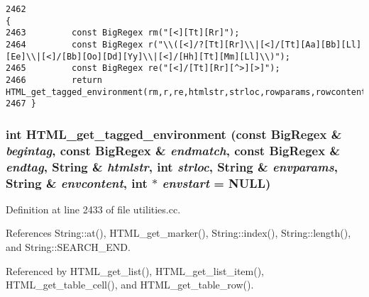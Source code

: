 \footnotesize\begin{verbatim}2462                                                                                                                      {
2463         const BigRegex rm("[<][Tt][Rr]");
2464         const BigRegex r("\\([<]/?[Tt][Rr]\\|[<]/[Tt][Aa][Bb][Ll][Ee]\\|[<]/[Bb][Oo][Dd][Yy]\\|[<]/[Hh][Tt][Mm][Ll]\\)");
2465         const BigRegex re("[<]/[Tt][Rr][^>][>]");
2466         return HTML_get_tagged_environment(rm,r,re,htmlstr,strloc,rowparams,rowcontent,rowstart);
2467 }
\end{verbatim}\normalsize 
{}
\subsubsection{\setlength{\rightskip}{0pt plus 5cm}int HTML\_\-get\_\-tagged\_\-environment (const {\bf Big\-Regex} \& {\em begintag}, const {\bf Big\-Regex} \& {\em endmatch}, const {\bf Big\-Regex} \& {\em endtag}, {\bf String} \& {\em htmlstr}, int {\em strloc}, {\bf String} \& {\em envparams}, {\bf String} \& {\em envcontent}, int $\ast$ {\em envstart} = NULL)}\label{utilities_8cc_a53}




Definition at line 2433 of file utilities.cc.

References String::at(), HTML\_\-get\_\-marker(), String::index(), String::length(), and String::SEARCH\_\-END.

Referenced by HTML\_\-get\_\-list(), HTML\_\-get\_\-list\_\-item(), HTML\_\-get\_\-table\_\-cell(), and HTML\_\-get\_\-table\_\-row().



